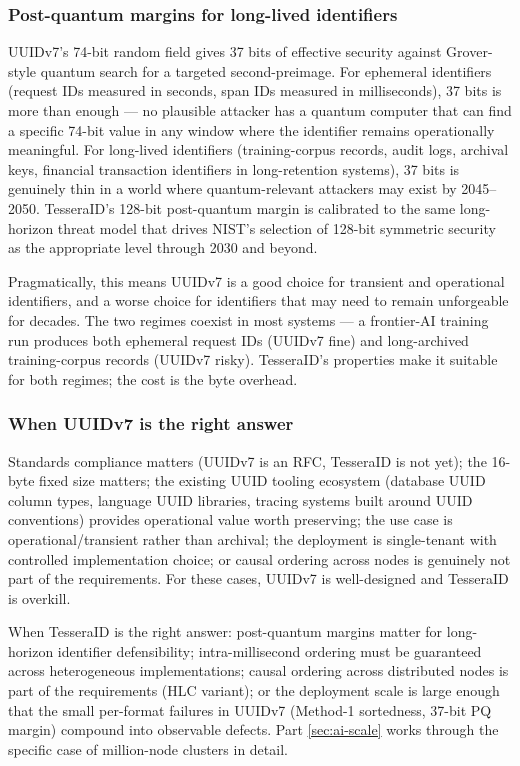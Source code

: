 \subsubsection{Post-quantum margins for long-lived identifiers}

UUIDv7's 74-bit random field gives 37 bits of effective security against Grover-style quantum search for a targeted second-preimage. For ephemeral identifiers (request IDs measured in seconds, span IDs measured in milliseconds), 37 bits is more than enough --- no plausible attacker has a quantum computer that can find a specific 74-bit value in any window where the identifier remains operationally meaningful. For long-lived identifiers (training-corpus records, audit logs, archival keys, financial transaction identifiers in long-retention systems), 37 bits is genuinely thin in a world where quantum-relevant attackers may exist by 2045--2050. TesseraID's 128-bit post-quantum margin is calibrated to the same long-horizon threat model that drives NIST's selection of 128-bit symmetric security as the appropriate level through 2030 and beyond.

Pragmatically, this means UUIDv7 is a good choice for transient and operational identifiers, and a worse choice for identifiers that may need to remain unforgeable for decades. The two regimes coexist in most systems --- a frontier-AI training run produces both ephemeral request IDs (UUIDv7 fine) and long-archived training-corpus records (UUIDv7 risky). TesseraID's properties make it suitable for both regimes; the cost is the byte overhead.

\subsubsection{When UUIDv7 is the right answer}

Standards compliance matters (UUIDv7 is an RFC, TesseraID is not yet); the 16-byte fixed size matters; the existing UUID tooling ecosystem (database UUID column types, language UUID libraries, tracing systems built around UUID conventions) provides operational value worth preserving; the use case is operational/transient rather than archival; the deployment is single-tenant with controlled implementation choice; or causal ordering across nodes is genuinely not part of the requirements. For these cases, UUIDv7 is well-designed and TesseraID is overkill.

When TesseraID is the right answer: post-quantum margins matter for long-horizon identifier defensibility; intra-millisecond ordering must be guaranteed across heterogeneous implementations; causal ordering across distributed nodes is part of the requirements (HLC variant); or the deployment scale is large enough that the small per-format failures in UUIDv7 (Method-1 sortedness, 37-bit PQ margin) compound into observable defects. Part \ref{sec:ai-scale} works through the specific case of million-node clusters in detail.


